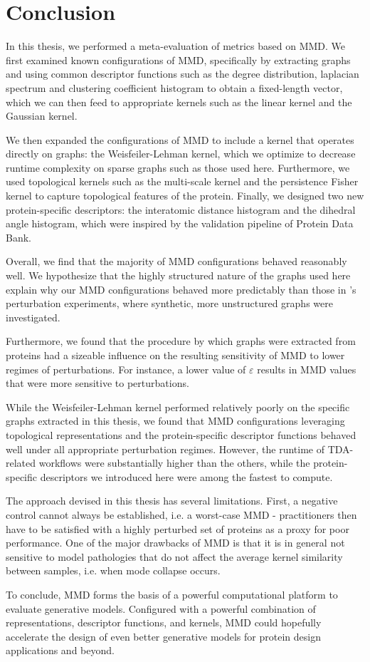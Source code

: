 \chapter{Conclusion}\label{chap:conclusion}

In this thesis, we performed a meta-evaluation of metrics based on MMD. We first
examined known configurations of MMD, specifically by extracting graphs and
using common descriptor functions such as the degree distribution, laplacian
spectrum and clustering coefficient histogram to obtain a fixed-length vector,
which we can then feed to appropriate kernels such as the linear kernel and the
Gaussian kernel.

We then expanded the configurations of MMD to include a kernel that operates
directly on graphs: the Weisfeiler-Lehman kernel, which we optimize to decrease
runtime complexity on sparse graphs such as those used here. Furthermore, we
used topological kernels such as the multi-scale kernel and the persistence
Fisher kernel to capture topological features of the protein. Finally, we
designed two new protein-specific descriptors: the interatomic distance
histogram and the dihedral angle histogram, which were inspired by the
validation pipeline of Protein Data Bank.

Overall, we find that the majority of MMD configurations behaved reasonably
well. We hypothesize that the highly structured nature of the graphs used here
explain why our MMD configurations behaved more predictably than those
in \cite{o2021evaluation}'s perturbation experiments, where synthetic, more
unstructured graphs were investigated.

Furthermore, we found that the procedure by which graphs were extracted from
proteins had a sizeable influence on the resulting sensitivity of MMD to lower
regimes of perturbations. For instance, a lower value of $\varepsilon$ results
in MMD values that were more sensitive to perturbations.

While the Weisfeiler-Lehman kernel performed relatively poorly on the specific
graphs extracted in this thesis, we found that MMD configurations leveraging
topological representations and the protein-specific descriptor functions
behaved well under all appropriate perturbation regimes. However, the runtime of
TDA-related workflows were substantially higher than the others, while the
protein-specific descriptors we introduced here were among the fastest to
compute.

The approach devised in this thesis has several limitations. First, a negative
control cannot always be established, i.e. a worst-case MMD - practitioners then
have to be satisfied with a highly perturbed set of proteins as a proxy for poor
performance. One of the major drawbacks of MMD is that it is in general not
sensitive to model pathologies that do not affect the average kernel similarity
between samples, i.e. when mode collapse occurs.

To conclude, MMD forms the basis of a powerful computational platform to
evaluate generative models. Configured with a powerful combination of
representations, descriptor functions, and kernels, MMD could hopefully
accelerate the design of even better generative models for protein design
applications and beyond.
